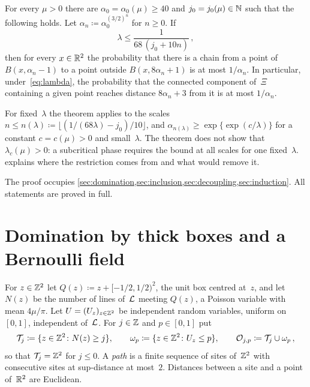 \documentclass[11pt,letterpaper]{article}
\newcommand{\cO}{\mathcal O}
\newcommand{\cT}{\mathcal T}
\begin{document}
\begin{theorem}
\label{thm:main}
For every $\mu>0$ there are $\alpha_0=\alpha_0(\mu)\ge40$ and $j_0=j_0(\mu)\in\mathbb N$ such that the following holds. Let $\alpha_n\coloneqq\alpha_0^{(3/2)^n}$ for $n\ge0$. If
\begin{equation}
\label{eq:lambda}
  \lambda\le\frac{1}{68\,(j_0+10n)}\,,
\end{equation}
then for every $x\in\mathbb R^2$ the probability that there is a chain from a point of $B(x,\alpha_n-1)$ to a point outside $B(x,8\alpha_n+1)$ is at most $1/\alpha_n$. In particular, under~\eqref{eq:lambda}, the probability that the connected component of~$\Xi$ containing a given point reaches distance $8\alpha_n+3$ from it is at most $1/\alpha_n$.
\end{theorem}

For fixed~$\lambda$ the theorem applies to the scales $n\le n(\lambda)\coloneqq\lfloor(1/(68\lambda)-j_0)/10\rfloor$, and $\alpha_{n(\lambda)}\ge\exp\{\exp(c/\lambda)\}$ for a constant $c=c(\mu)>0$ and small~$\lambda$. The theorem does not show that $\lambda_c(\mu)>0$: a subcritical phase requires the bound at all scales for one fixed~$\lambda$.  explains where the restriction comes from and what would remove it.

The proof occupies \cref{sec:domination,sec:inclusion,sec:decoupling,sec:induction}. All statements are proved in full.

\section{Domination by thick boxes and a Bernoulli field}
\label{sec:domination}

For $z\in\mathbb Z^2$ let $Q(z)\coloneqq z+[-1/2,1/2)^2$, the unit box centred at~$z$, and let $N(z)$ be the number of lines of~$\mathcal L$ meeting $Q(z)$, a Poisson variable with mean $4\mu/\pi$. Let $U=(U_z)_{z\in\mathbb Z^2}$ be independent random variables, uniform on $[0,1]$, independent of~$\mathcal L$. For $j\in\mathbb Z$ and $p\in[0,1]$ put
\begin{equation}
\label{eq:O}
  \cT_j\coloneqq\{z\in\Z^2\colon N(z)\ge j\},\qquad\omega_p\coloneqq\{z\in\Z^2\colon U_z\le p\},\qquad\cO_{j,p}\coloneqq\cT_j\cup\omega_p\,,
\end{equation}
so that $\cT_j=\Z^2$ for $j\le0$. A \emph{path} is a finite sequence of sites of~$\mathbb Z^2$ with consecutive sites at sup-distance at most~$2$. Distances between a site and a point of~$\mathbb R^2$ are Euclidean.
\end{document}
